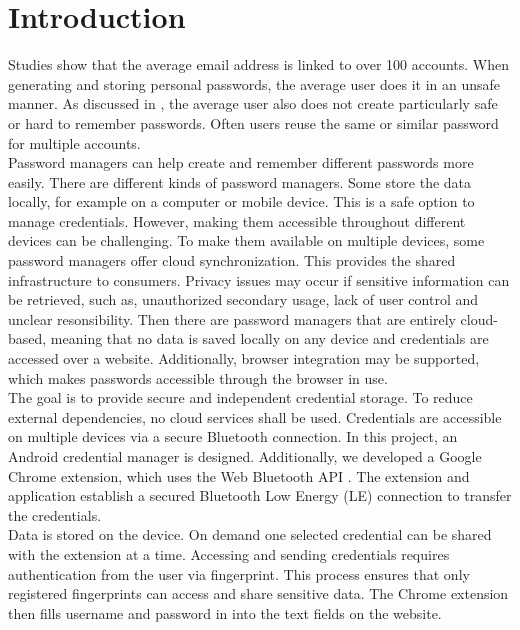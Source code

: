 \section*{Introduction}
\label{introduction}

Studies show that the average email address is linked to over 100 accounts. \cite{DigitalGuardian} 
When generating and storing personal passwords, the average user does it in an unsafe manner. \cite{pilar2012passwords} As discussed in \cite{DBLP:journals/cacm/AdamsS99}, the average user also does not create particularly safe or hard to remember passwords. Often users reuse the same or similar password for multiple accounts. \cite{DBLP:journals/cacm/AdamsS99} \cite{pilar2012passwords} \cite{Statista}  \\

Password managers can help create and remember different passwords more easily. There are different kinds of password managers. Some store the data locally, for example on a computer or mobile device. This is a safe option to manage credentials. However, making them accessible throughout different devices can be challenging. To make them available on multiple devices, some password managers offer cloud synchronization. 
This provides the shared infrastructure to consumers. Privacy issues may occur if sensitive information can be retrieved, such as, unauthorized secondary usage, lack of user control and unclear resonsibility. \cite{DBLP:journals/corr/SainiM14} Then there are password managers that are entirely cloud-based, meaning that no data is saved locally on any device and credentials are accessed over a website. Additionally, browser integration may be supported, which makes passwords accessible through the browser in use. \\

The goal is to provide secure and independent credential storage. To reduce external dependencies, no cloud services shall be used. Credentials are accessible on multiple devices via a secure Bluetooth connection. In this project, an Android credential manager is designed.  Additionally, we developed a Google Chrome extension, which uses the Web Bluetooth API \cite{WebBTAPI}. The extension and application establish a secured Bluetooth Low Energy (LE) connection to transfer the credentials. \\
Data is stored on the device. On demand one selected credential can be shared with the extension at a time. Accessing and sending credentials requires authentication from the user via fingerprint. This process ensures that only registered fingerprints can access and share sensitive data. 
The Chrome extension then fills username and password in into the text fields on the website. \\

